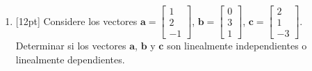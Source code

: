 \documentclass[11pt]{article}
\begin{document}
\begin{enumerate}
\begin{enumerate}
\vspace{6cm}

\item{}[12pt] Considere los vectores $\mathbf{a} = \begin{bmatrix}1\\2\\-1\end{bmatrix}$, $\mathbf{b} = \begin{bmatrix}0\\3\\1\end{bmatrix}$, $\mathbf{c} = \begin{bmatrix}2\\1\\-3\end{bmatrix}$. Determinar si los vectores $\mathbf{a}$, $\mathbf{b}$ y $\mathbf{c}$ son linealmente independientes o linealmente dependientes.

\vspace{5cm}
\end{enumerate}
\end{enumerate}

\examfooter
\end{document}

